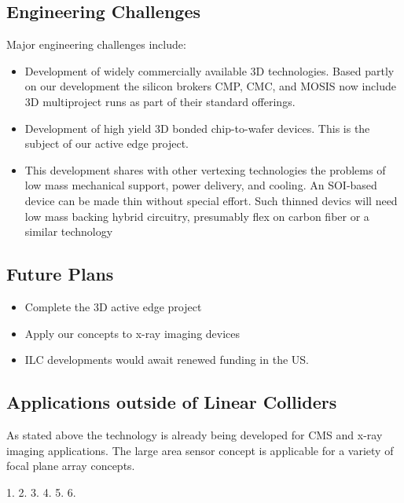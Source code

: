 \subsection{Engineering Challenges}
Major  engineering challenges include:
\begin{itemize}
\item Development of widely commercially available 3D technologies.  Based partly on our development the silicon brokers CMP, CMC, and MOSIS now include 3D multiproject runs as part of their standard offerings.
\item Development of high yield 3D bonded chip-to-wafer devices.  This is the subject of our active edge project.
\item This development shares with other vertexing technologies the problems of low mass mechanical support, power delivery, and cooling. An SOI-based device can be made thin without special effort. Such thinned devics will need low mass backing hybrid circuitry, presumably flex on carbon fiber or a similar technology
\end{itemize}

\subsection{Future Plans}
\begin{itemize}
\item Complete the 3D active edge project
\item Apply our concepts to x-ray imaging devices
\item ILC developments would await renewed funding in the US.
\end{itemize}

\subsection{Applications outside of Linear Colliders}
As stated above the technology is already being developed for CMS and x-ray imaging applications.  The large area sensor concept is applicable for a variety of focal plane array concepts.

1.  
2.  
3.  
4.  
5.  
6.  
